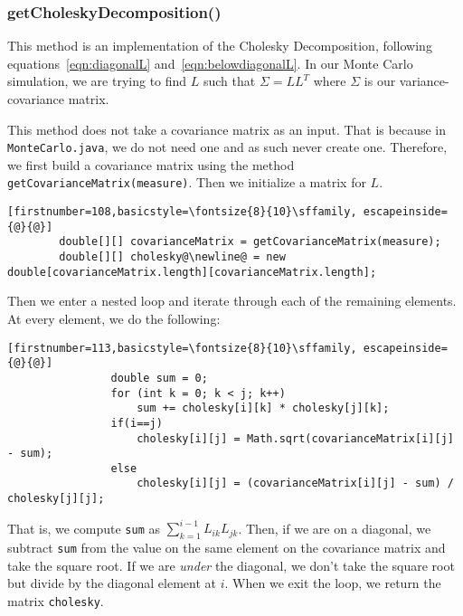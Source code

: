 \documentclass[../Dissertation.tex]{subfiles}
\begin{document}
\subsubsection{getCholeskyDecomposition()}

This method is an implementation of the Cholesky Decomposition, following equations~\ref{eqn:diagonalL} and~\ref{eqn:belowdiagonalL}.
In our Monte Carlo simulation, we are trying to find $L$ such that $\Sigma = LL^T$ where $\Sigma$ is our variance-covariance matrix.

This method does not take a covariance matrix as an input.
That is because in \lstinline|MonteCarlo.java|, we do not need one and as such never create one.
Therefore, we first build a covariance matrix using the method \lstinline|getCovarianceMatrix(measure)|.
Then we initialize a matrix for $L$.
\begin{lstlisting}[firstnumber=108,basicstyle=\fontsize{8}{10}\sffamily, escapeinside={@}{@}]
		double[][] covarianceMatrix = getCovarianceMatrix(measure);
		double[][] cholesky@\newline@ = new double[covarianceMatrix.length][covarianceMatrix.length];
\end{lstlisting}

Then we enter a nested loop and iterate through each of the remaining elements.
At every element, we do the following:
\begin{lstlisting}[firstnumber=113,basicstyle=\fontsize{8}{10}\sffamily, escapeinside={@}{@}]
                double sum = 0;
                for (int k = 0; k < j; k++)
                    sum += cholesky[i][k] * cholesky[j][k];
                if(i==j)
                    cholesky[i][j] = Math.sqrt(covarianceMatrix[i][j] - sum);
                else
                    cholesky[i][j] = (covarianceMatrix[i][j] - sum) / cholesky[j][j];
\end{lstlisting}
That is, we compute \lstinline|sum| as $\sum_{k=1}^{i-1}L_{ik}L_{jk}$.
Then, if we are on a diagonal, we subtract \lstinline|sum| from the value on the same element on the covariance matrix and take the square root.
If we are \textit{under} the diagonal, we don't take the square root but divide by the diagonal element at $i$.
When we exit the loop, we return the matrix \lstinline|cholesky|.
\end{document}
